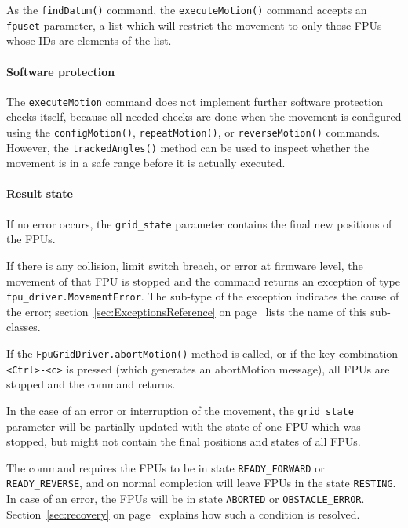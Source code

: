 \documentclass[11pt,a4paper]{report}
\begin{document}
As the \texttt{findDatum()} command, the \texttt{executeMotion()}
command accepts an \texttt{fpuset} parameter, a list which will
restrict the movement to only those FPUs whose IDs are elements of the
list.

\paragraph{Software protection}
The \texttt{executeMotion} command does not implement further software
protection checks itself, because all needed checks are done when the
movement is configured using the \texttt{configMotion()},
\texttt{repeatMotion()}, or \texttt{reverseMotion()}
commands. However, the \texttt{trackedAngles()} method can be used to
inspect whether the movement is in a safe range before it is actually
executed.

\paragraph{Result state}
If no error occurs, the \texttt{grid\_state} parameter contains the
final new positions of the FPUs.

If there is any collision, limit switch breach, or error at firmware
level, the movement of that FPU is stopped and the command returns an
exception of type \texttt{fpu\_driver.MovementError}. The sub-type of
the exception indicates the cause of the error;
section~\ref{sec:ExceptionsReference} on
page~\pageref{sec:ExceptionsReference} lists the name of this
sub-classes.

If the \texttt{FpuGridDriver.abortMotion()} method is called, or if
the key combination \texttt{<Ctrl>-<c>} is pressed (which generates an
abortMotion message), all FPUs are stopped and the command returns.

In the case of an error or interruption of the movement, the
\texttt{grid\_state} parameter will be partially updated with the
state of one FPU which was stopped, but might not contain the final
positions and states of all FPUs.

The command requires the FPUs to be in state \texttt{READY\_FORWARD}
or \texttt{READY\_REVERSE}, and on normal completion will leave FPUs
in the state \texttt{RESTING}. In case of an error, the FPUs will be
in state \texttt{ABORTED} or \texttt{OBSTACLE\_ERROR}.
Section~\ref{sec:recovery} on page~\pageref{sec:recovery} explains how
such a condition is resolved.
\end{document}
